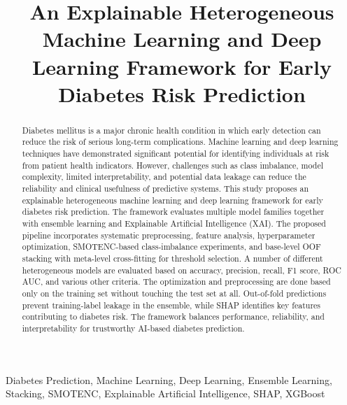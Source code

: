 \documentclass[conference]{IEEEtran}
\begin{document}
\title{An Explainable Heterogeneous Machine Learning and Deep Learning Framework for Early Diabetes Risk Prediction}

\author{
}

\maketitle

\begin{abstract}
Diabetes mellitus is a major chronic health condition in which early detection can reduce the risk of serious long-term complications. Machine learning and deep learning techniques have demonstrated significant potential for identifying individuals at risk from patient health indicators. However, challenges such as class imbalance, model complexity, limited interpretability, and potential data leakage can reduce the reliability and clinical usefulness of predictive systems. This study proposes an explainable heterogeneous machine learning and deep learning framework for early diabetes risk prediction. The framework evaluates multiple model families together with ensemble learning and Explainable Artificial Intelligence (XAI). The proposed pipeline incorporates systematic preprocessing, feature analysis, hyperparameter optimization, SMOTENC-based class-imbalance experiments, and base-level OOF stacking with meta-level cross-fitting for threshold selection. A number of different heterogeneous models are evaluated based on accuracy, precision, recall, F1 score, ROC AUC, and various other criteria. The optimization and preprocessing are done based only on the training set without touching the test set at all. Out-of-fold predictions prevent training-label leakage in the ensemble, while SHAP identifies key features contributing to diabetes risk. The framework balances performance, reliability, and interpretability for trustworthy AI-based diabetes prediction.
\end{abstract}

\begin{IEEEkeywords}
Diabetes Prediction, Machine Learning, Deep Learning, Ensemble Learning, Stacking, SMOTENC, Explainable Artificial Intelligence, SHAP, XGBoost
\end{IEEEkeywords}
\end{document}
